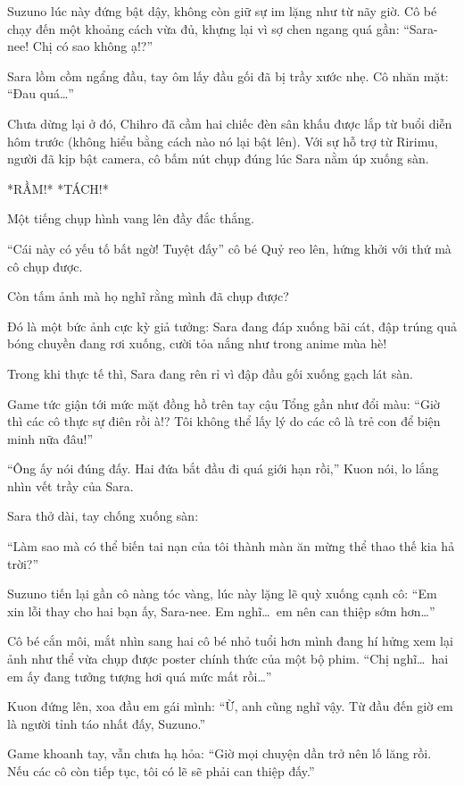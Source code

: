 \documentclass[../main.tex]{subfiles}
\begin{document}
Suzuno lúc này đứng bật dậy, không còn giữ sự im lặng như từ nãy giờ. Cô bé chạy đến một khoảng cách vừa đủ, khựng lại vì sợ chen ngang quá gần: ``Sara-nee! Chị có sao không ạ!?''

Sara lồm cồm ngẩng đầu, tay ôm lấy đầu gối đã bị trầy xước nhẹ. Cô nhăn mặt: ``Đau quá\dots''

Chưa dừng lại ở đó, Chihro đã cầm hai chiếc đèn sân khấu được lắp từ buổi diễn hôm trước (không hiểu bằng cách nào nó lại bật lên). Với sự hỗ trợ từ Ririmu, người đã kịp bật camera, cô bấm nút chụp đúng lúc Sara nằm úp xuống sàn.

*RẦM!* *TÁCH!*

Một tiếng chụp hình vang lên đầy đắc thắng.

``Cái này có yếu tố bất ngờ! Tuyệt đấy'' cô bé Quỷ reo lên, hứng khởi với thứ mà cô chụp được.

Còn tấm ảnh mà họ nghĩ rằng mình đã chụp được?

Đó là một bức ảnh cực kỳ giả tưởng: Sara đang đáp xuống bãi cát, đập trúng quả bóng chuyền đang rơi xuống, cười tỏa nắng như trong anime mùa hè!


Trong khi thực tế thì, Sara đang rên rỉ vì đập đầu gối xuống gạch lát sàn.

Game tức giận tới mức mặt đồng hồ trên tay cậu Tổng gần như đổi màu: ``Giờ thì các cô thực sự điên rồi à!? Tôi không thể lấy lý do các cô là trẻ con để biện minh nữa đâu!''

``Ông ấy nói đúng đấy. Hai đứa bắt đầu đi quá giới hạn rồi,'' Kuon nói, lo lắng nhìn vết trầy của Sara.

Sara thở dài, tay chống xuống sàn:

``Làm sao mà có thể biến tai nạn của tôi thành màn ăn mừng thể thao thế kia hả trời?''

Suzuno tiến lại gần cô nàng tóc vàng, lúc này lặng lẽ quỳ xuống cạnh cô: ``Em xin lỗi thay cho hai bạn ấy, Sara-nee. Em nghĩ\dots\ em nên can thiệp sớm hơn\dots''

Cô bé cắn môi, mắt nhìn sang hai cô bé nhỏ tuổi hơn mình đang hí hửng xem lại ảnh như thể vừa chụp được poster chính thức của một bộ phim. ``Chị nghĩ\dots\ hai em ấy đang tưởng tượng hơi quá mức mất rồi\dots''

Kuon đứng lên, xoa đầu em gái mình: ``Ừ, anh cũng nghĩ vậy. Từ đầu đến giờ em là người tỉnh táo nhất đấy, Suzuno.''

Game khoanh tay, vẫn chưa hạ hỏa: ``Giờ mọi chuyện dần trở nên lố lăng rồi. Nếu các cô còn tiếp tục, tôi có lẽ sẽ phải can thiệp đấy.''
\end{document}
